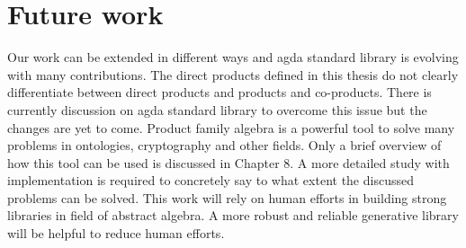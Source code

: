 \section{Future work}
\label{future}
Our work can be extended in different ways and agda standard library is evolving with many contributions. The direct products defined in this thesis do not clearly differentiate between direct products and products and co-products. There is currently discussion on agda standard library to overcome this issue but the changes are yet to come. Product family algebra is a powerful tool to solve many problems in ontologies, cryptography and other fields. Only a brief overview of how this tool can be used is discussed in Chapter 8. A more detailed study with implementation is required to concretely say to what extent the discussed problems can be solved. This work will rely on human efforts in building strong libraries in field of abstract algebra. A more robust and reliable generative library will be helpful to reduce human efforts. 


